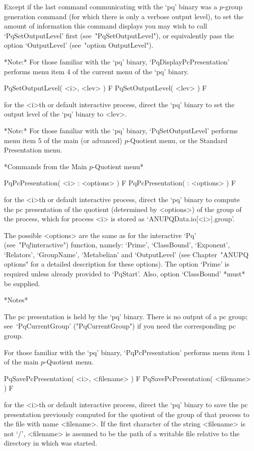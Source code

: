 Except if the last command communicating  with  the  `pq'  binary  was  a
$p$-group generation command (for which there is only  a  verbose  output
level), to set the amount of information this command  displays  you  may
wish  to  call  `PqSetOutputLevel'  first  (see~"PqSetOutputLevel"),   or
equivalently pass the option `OutputLevel' (see~"option OutputLevel").

*Note:*
For  those  familiar  with  the  `pq'  binary,  `PqDisplayPcPresentation'
performs menu item 4 of the current menu of the `pq' binary.

\>PqSetOutputLevel( <i>, <lev> ) F
\>PqSetOutputLevel( <lev> ) F

for the <i>th or default interactive {\ANUPQ} process,  direct  the  `pq'
binary to set the output level of the `pq' binary to <lev>.

*Note:* For those  familiar  with  the  `pq'  binary,  `PqSetOutputLevel'
performs menu item 5 of the main (or advanced) $p$-Quotient menu, or  the
Standard Presentation menu.

*Commands from the Main $p$-Quotient menu*

\>PqPcPresentation( <i> : <options> ) F
\>PqPcPresentation( : <options> ) F

for the <i>th or default interactive {\ANUPQ} process,  direct  the  `pq'
binary to compute the pc presentation  of  the  quotient  (determined  by
<options>) of the group of the process, which for process <i>  is  stored
as `ANUPQData.io[<i>].group'.

The  possible  <options>  are  the  same  as  for  the  interactive  `Pq'
(see~"Pq!interactive")   function,   namely:    `Prime',    `ClassBound',
`Exponent', `Relators', `GroupName', `Metabelian' and `OutputLevel'  (see
Chapter~"ANUPQ options" for a detailed description  for  these  options).
The option `Prime' is required  unless  already  provided  to  `PqStart'.
Also, option `ClassBound' *must* be supplied.

*Notes* 

The pc presentation is held by the `pq' binary. There is no output  of  a
{\GAP} pc group; see~`PqCurrentGroup' ("PqCurrentGroup") if you need  the
corresponding {\GAP} pc group.

For those familiar with the `pq' binary, `PqPcPresentation' performs menu
item 1 of the main $p$-Quotient menu.

\>PqSavePcPresentation( <i>, <filename> ) F
\>PqSavePcPresentation( <filename> ) F

for the <i>th or default interactive {\ANUPQ} process,  direct  the  `pq'
binary to save the pc presentation previously computed for  the  quotient
of the group of that process to the file with  name  <filename>.  If  the
first character of the  string  <filename>  is  not  `/',  <filename>  is
assumed to be the path of a writable file relative to  the  directory  in
which {\GAP} was started.

